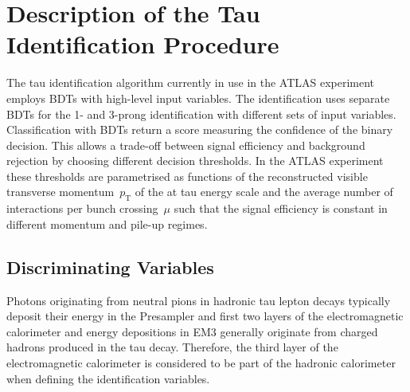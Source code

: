 \section{Description of the Tau Identification Procedure}
\label{sec:bdt_tauid}
The tau identification algorithm currently in use in the ATLAS experiment
employs BDTs with high-level input variables. The identification uses separate
BDTs for the 1- and 3-prong identification with different sets of input
variables. Classification with BDTs return a score measuring the confidence of
the binary decision. This allows a trade-off between signal efficiency and
background rejection by choosing different decision thresholds. In the ATLAS
experiment these thresholds are parametrised as functions of the reconstructed
visible transverse momentum~$p_\text{T}$ of the \tauhadvis at tau energy scale
and the average number of interactions per bunch crossing~$\mu$ such that the
signal efficiency is constant in different momentum and pile-up regimes.

\subsection{Discriminating Variables}
\label{sec:bdt_features}

Photons originating from neutral pions in hadronic tau lepton decays typically
deposit their energy in the Presampler and first two layers of the
electromagnetic calorimeter and energy depositions in EM3 generally originate
from charged hadrons produced in the tau decay. Therefore, the third layer of
the electromagnetic calorimeter is considered to be part of the hadronic
calorimeter when defining the identification variables.


